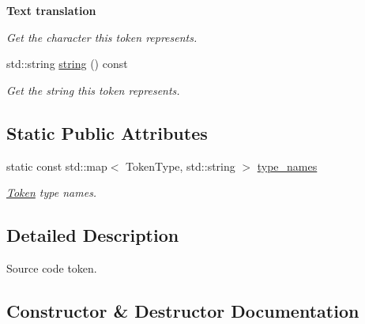 \begin{Indent}{\bf Text translation}
\begin{DoxyCompactItemize}
\begin{DoxyCompactList}\small\item\em Get the character this token represents. \end{DoxyCompactList}\item 
std\+::string \hyperlink{classcreek_1_1_token_a929d6edefa9fb93584f8a511051ddf80}{string} () const \hypertarget{classcreek_1_1_token_a929d6edefa9fb93584f8a511051ddf80}{}\label{classcreek_1_1_token_a929d6edefa9fb93584f8a511051ddf80}

\begin{DoxyCompactList}\small\item\em Get the string this token represents. \end{DoxyCompactList}\end{DoxyCompactItemize}
\end{Indent}
\subsection*{Static Public Attributes}
\begin{DoxyCompactItemize}
\item 
static const std\+::map$<$ Token\+Type, std\+::string $>$ \hyperlink{classcreek_1_1_token_ae929ae6967f5a1d22a341a7cf02e183d}{type\+\_\+names}
\begin{DoxyCompactList}\small\item\em \hyperlink{classcreek_1_1_token}{Token} type names. \end{DoxyCompactList}\end{DoxyCompactItemize}


\subsection{Detailed Description}
Source code token. 

\subsection{Constructor \& Destructor Documentation}
